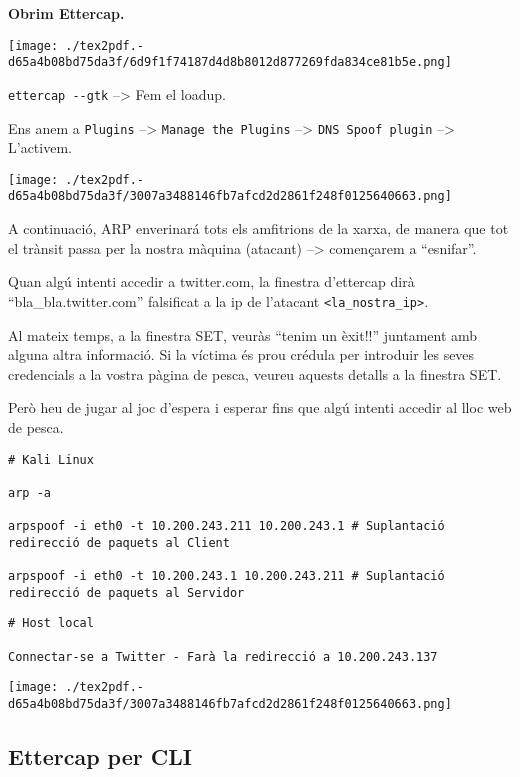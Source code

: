 \documentclass[]{article}
\begin{document}
\textbf{Obrim Ettercap.}

\texttt{[image: ./tex2pdf.-d65a4b08bd75da3f/6d9f1f74187d4d8b8012d877269fda834ce81b5e.png]}

\texttt{ettercap\ -\/-gtk} --\textgreater{} Fem el loadup.

Ens anem a \texttt{Plugins} --\textgreater{}
\texttt{Manage\ the\ Plugins} --\textgreater{}
\texttt{DNS\ Spoof\ plugin} --\textgreater{} L'activem.

\texttt{[image: ./tex2pdf.-d65a4b08bd75da3f/3007a3488146fb7afcd2d2861f248f0125640663.png]}

A continuació, ARP enverinará tots els amfitrions de la xarxa, de manera
que tot el trànsit passa per la nostra màquina (atacant)
--\textgreater{} començarem a ``esnifar''.

Quan algú intenti accedir a twitter.com, la finestra d'ettercap dirà
``bla\_bla.twitter.com'' falsificat a la ip de l'atacant
\texttt{\textless{}la\_nostra\_ip\textgreater{}}.

Al mateix temps, a la finestra SET, veuràs ``tenim un èxit!!'' juntament
amb alguna altra informació. Si la víctima és prou crédula per introduir
les seves credencials a la vostra pàgina de pesca, veureu aquests
detalls a la finestra SET.

Però heu de jugar al joc d'espera i esperar fins que algú intenti
accedir al lloc web de pesca.

\begin{verbatim}
# Kali Linux

arp -a

arpspoof -i eth0 -t 10.200.243.211 10.200.243.1 # Suplantació redirecció de paquets al Client

arpspoof -i eth0 -t 10.200.243.1 10.200.243.211 # Suplantació redirecció de paquets al Servidor
\end{verbatim}

\begin{verbatim}
# Host local

Connectar-se a Twitter - Farà la redirecció a 10.200.243.137

\end{verbatim}

\texttt{[image: ./tex2pdf.-d65a4b08bd75da3f/3007a3488146fb7afcd2d2861f248f0125640663.png]}

\hypertarget{ettercap-per-cli}{%
\subsection{\texorpdfstring{\textbf{Ettercap per
CLI}}{Ettercap per CLI}}\label{ettercap-per-cli}}
\end{document}
